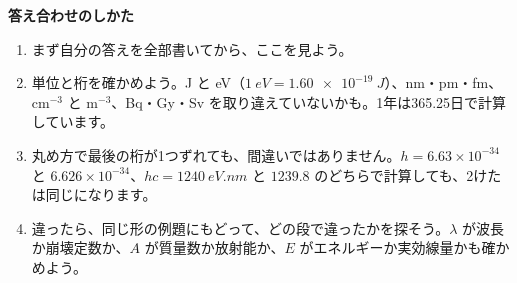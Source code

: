\begin{tcolorbox}[bk base, unbreakable, colframe=bkTheme!60, colback=bkTheme!5, boxrule=0.8pt, arc=2mm, left=4mm, right=4mm, top=2mm, bottom=2mm]
{\sffamily\bfseries\color{bkDeep}答え合わせのしかた}\par\vspace{1mm}
\begin{enumerate}[label={\bkcircled{\arabic*}}, leftmargin=2.4\zw, itemsep=0pt, topsep=0pt]
\item まず自分の答えを全部書いてから、ここを見よう。
\item 単位と桁を確かめよう。J と eV（$\qty{1}{eV}=\qty{1.60e-19}{J}$）、nm・pm・fm、cm$^{-3}$ と m$^{-3}$、Bq・Gy・Sv を取り違えていないかも。1年は365.25日で計算しています。
\item 丸め方で最後の桁が1つずれても、間違いではありません。$h=6.63\times10^{-34}$ と $6.626\times10^{-34}$、$hc=\qty{1240}{eV.nm}$ と $1239.8$ のどちらで計算しても、2けたは同じになります。
\item 違ったら、同じ形の例題にもどって、どの段で違ったかを探そう。$\lambda$ が波長か崩壊定数か、$A$ が質量数か放射能か、$E$ がエネルギーか実効線量かも確かめよう。
\end{enumerate}
\end{tcolorbox}

